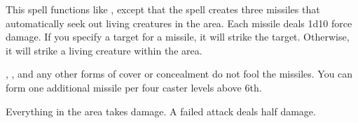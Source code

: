 \spellrng{\rngmed}
\begin{spelleffect}
  This spell functions like , except that the spell creates three missiles that automatically seek out living creatures in the area. Each missile deals 1d10 force damage. If you specify a target for a missile, it will strike the target. Otherwise, it will strike a living creature within the area.
  
  , , and any other forms of cover or concealment do not fool the missiles. You can form one additional missile per four caster levels above 6th.
\end{spelleffect}

\begin{spelleffect}
    Everything in the area takes damage. A failed attack deals half damage.
\end{spelleffect}
\begin{spellnotes}
    \destructivespellnotes
\end{spellnotes}

